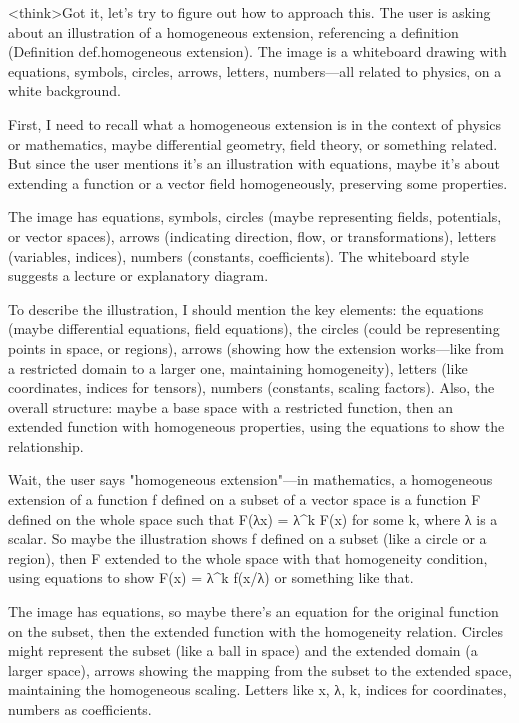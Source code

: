 <think>Got it, let's try to figure out how to approach this. The user is asking about an illustration of a homogeneous extension, referencing a definition (Definition def.homogeneous extension). The image is a whiteboard drawing with equations, symbols, circles, arrows, letters, numbers—all related to physics, on a white background. 

First, I need to recall what a homogeneous extension is in the context of physics or mathematics, maybe differential geometry, field theory, or something related. But since the user mentions it's an illustration with equations, maybe it's about extending a function or a vector field homogeneously, preserving some properties. 

The image has equations, symbols, circles (maybe representing fields, potentials, or vector spaces), arrows (indicating direction, flow, or transformations), letters (variables, indices), numbers (constants, coefficients). The whiteboard style suggests a lecture or explanatory diagram. 

To describe the illustration, I should mention the key elements: the equations (maybe differential equations, field equations), the circles (could be representing points in space, or regions), arrows (showing how the extension works—like from a restricted domain to a larger one, maintaining homogeneity), letters (like coordinates, indices for tensors), numbers (constants, scaling factors). Also, the overall structure: maybe a base space with a restricted function, then an extended function with homogeneous properties, using the equations to show the relationship. 

Wait, the user says "homogeneous extension"—in mathematics, a homogeneous extension of a function f defined on a subset of a vector space is a function F defined on the whole space such that F(λx) = λ^k F(x) for some k, where λ is a scalar. So maybe the illustration shows f defined on a subset (like a circle or a region), then F extended to the whole space with that homogeneity condition, using equations to show F(x) = λ^k f(x/λ) or something like that. 

The image has equations, so maybe there's an equation for the original function on the subset, then the extended function with the homogeneity relation. Circles might represent the subset (like a ball in space) and the extended domain (a larger space), arrows showing the mapping from the subset to the extended space, maintaining the homogeneous scaling. Letters like x, λ, k, indices for coordinates, numbers as coefficients. 

